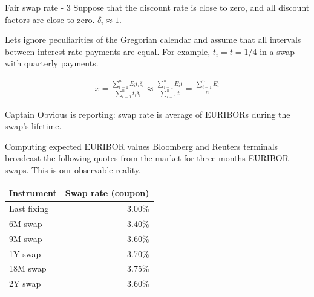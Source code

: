 \documentclass{beamer}
\begin{document}
\begin{frame}{Fair swap rate - 3}
\justify
Suppose that the discount rate is close to zero, and all discount factors are close to zero. $\delta_i \approx1$.

\justify
Lets ignore peculiarities of the Gregorian calendar and assume that all intervals between interest rate payments are equal. For example, $t_i = t = 1/4$ in a swap with quarterly payments.

\begin{align*}
x = \frac{\sum\limits_{i=1}^{n} E_i t_i \delta_i}{\sum\limits_{i=1}^{n} t_i \delta_i}
\approx
\frac{\sum\limits_{i=1}^{n} E_i t}{\sum\limits_{i=1}^{n} t}
=
\frac{\sum\limits_{i=1}^{n} E_i}{n}
\end{align*}

\justify
Captain Obvious is reporting: swap rate is average of EURIBORs during the swap's lifetime.
\end{frame}



\begin{frame}{Computing expected EURIBOR values}
\justify
Bloomberg and Reuters terminals broadcast the following quotes from the market for three months EURIBOR swaps. This is our observable reality.

\justify
\centering
\begin{tabular}{l|r}
Instrument        & Swap rate (coupon) \\ \hline
Last fixing & 3.00\% \\
6M swap           & 3.40\% \\
9M swap           & 3.60\% \\
1Y swap           & 3.70\% \\
18M swap          & 3.75\% \\
2Y swap           & 3.60\%
\end{tabular}

\end{frame}
\end{document}
